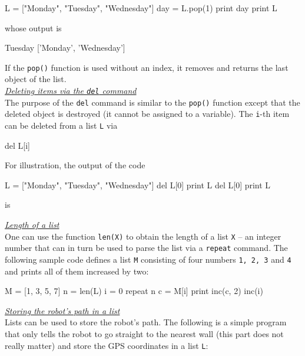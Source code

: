 \begin{bluecode}
L = ["Monday", "Tuesday", "Wednesday"]
day = L.pop(1)
print day
print L
\end{bluecode}
whose output is 

\begin{bluecode}
Tuesday
['Monday', 'Wednesday']
\end{bluecode}
If the {\tt pop()} function is used without an index, it removes
and returns the last object of the list.\\

\noindent
\underline{\em Deleting items via the {\tt del} command}\\

The purpose of the {\tt del} command is similar to the {\tt pop()} function
except that the deleted object is destroyed (it cannot be assigned to a variable).
The {\tt i}-th item can be deleted from a list {\tt L} via 

\begin{bluecode}
del L[i]
\end{bluecode}
For illustration, the output of the code 

\begin{bluecode}
L = ["Monday", "Tuesday", "Wednesday"]
del L[0]
print L
del L[0]
print L
\end{bluecode}
is 

\begin{bluecode}
\end{bluecode}
\underline{\em Length of a list}\\

One can use the function {\tt len(X)} to obtain the length of a list {\tt X} -- an integer
number that can in turn be used to parse the list via a {\tt repeat} command.
The following sample code defines a list {\tt M} consisting of four numbers 
{\tt 1, 2, 3} and {\tt 4} and prints all of them increased by two: 

\begin{bluecode}
M = [1, 3, 5, 7]
n = len(L)
i = 0
repeat n
    c = M[i]
    print inc(c, 2)
    inc(i)
\end{bluecode}
\underline{\em Storing the robot's path in a list}\\

Lists can be used to store the robot's path. The following 
is a simple program that only tells the robot to go straight to the 
nearest wall (this part does not really matter) and store the GPS
coordinates in a list {\tt L}:

